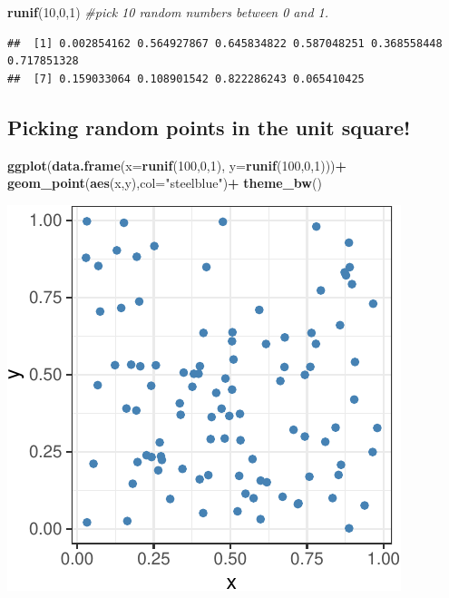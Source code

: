 \documentclass[
]{book}
\newenvironment{Shaded}{\begin{snugshade}}{\end{snugshade}}
\newcommand{\AttributeTok}[1]{\textcolor[rgb]{0.13,0.29,0.53}{#1}}
\newcommand{\CommentTok}[1]{\textcolor[rgb]{0.56,0.35,0.01}{\textit{#1}}}
\newcommand{\DecValTok}[1]{\textcolor[rgb]{0.00,0.00,0.81}{#1}}
\newcommand{\FunctionTok}[1]{\textcolor[rgb]{0.13,0.29,0.53}{\textbf{#1}}}
\newcommand{\NormalTok}[1]{#1}
\newcommand{\SpecialCharTok}[1]{\textcolor[rgb]{0.81,0.36,0.00}{\textbf{#1}}}
\newcommand{\StringTok}[1]{\textcolor[rgb]{0.31,0.60,0.02}{#1}}
\theoremstyle{definition}
\theoremstyle{definition}
\theoremstyle{definition}
\theoremstyle{definition}
\theoremstyle{remark}
\begin{document}
\begin{Shaded}
\begin{Highlighting}[]
\FunctionTok{runif}\NormalTok{(}\DecValTok{10}\NormalTok{,}\DecValTok{0}\NormalTok{,}\DecValTok{1}\NormalTok{) }\CommentTok{\#pick 10 random numbers between 0 and 1.}
\end{Highlighting}
\end{Shaded}

\begin{verbatim}
##  [1] 0.002854162 0.564927867 0.645834822 0.587048251 0.368558448 0.717851328
##  [7] 0.159033064 0.108901542 0.822286243 0.065410425
\end{verbatim}

\subsection*{Picking random points in the unit square!}\label{picking-random-points-in-the-unit-square}

\begin{Shaded}
\begin{Highlighting}[]
\FunctionTok{ggplot}\NormalTok{(}\FunctionTok{data.frame}\NormalTok{(}\AttributeTok{x=}\FunctionTok{runif}\NormalTok{(}\DecValTok{100}\NormalTok{,}\DecValTok{0}\NormalTok{,}\DecValTok{1}\NormalTok{),}
                 \AttributeTok{y=}\FunctionTok{runif}\NormalTok{(}\DecValTok{100}\NormalTok{,}\DecValTok{0}\NormalTok{,}\DecValTok{1}\NormalTok{)))}\SpecialCharTok{+}
  \FunctionTok{geom\_point}\NormalTok{(}\FunctionTok{aes}\NormalTok{(x,y),}\AttributeTok{col=}\StringTok{"steelblue"}\NormalTok{)}\SpecialCharTok{+}
  \FunctionTok{theme\_bw}\NormalTok{()}
\end{Highlighting}
\end{Shaded}

\includegraphics{math340-notes_files/figure-latex/unnamed-chunk-168-1.pdf}
\end{document}
